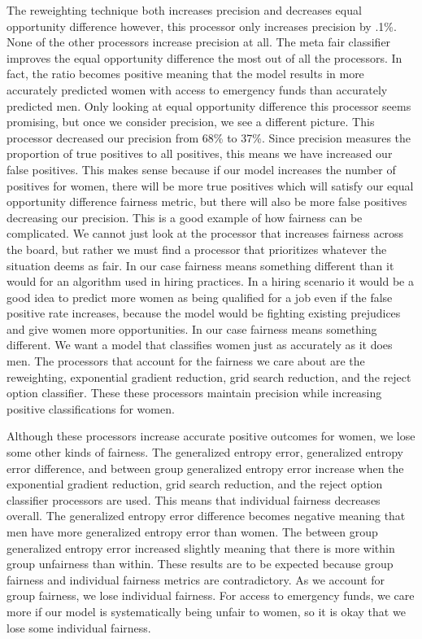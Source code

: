 \documentclass[water,article,submit,moreauthors,pdftex]{mdpi}
\begin{document}
The reweighting technique both increases precision and decreases equal
opportunity difference however, this processor only increases precision
by .1\%. None of the other processors increase precision at all. The
meta fair classifier improves the equal opportunity difference the most
out of all the processors. In fact, the ratio becomes positive meaning
that the model results in more accurately predicted women with access to
emergency funds than accurately predicted men. Only looking at equal
opportunity difference this processor seems promising, but once we
consider precision, we see a different picture. This processor decreased
our precision from 68\% to 37\%. Since precision measures the proportion
of true positives to all positives, this means we have increased our
false positives. This makes sense because if our model increases the
number of positives for women, there will be more true positives which
will satisfy our equal opportunity difference fairness metric, but there
will also be more false positives decreasing our precision. This is a
good example of how fairness can be complicated. We cannot just look at
the processor that increases fairness across the board, but rather we
must find a processor that prioritizes whatever the situation deems as
fair. In our case fairness means something different than it would for
an algorithm used in hiring practices. In a hiring scenario it would be
a good idea to predict more women as being qualified for a job even if
the false positive rate increases, because the model would be fighting
existing prejudices and give women more opportunities. In our case
fairness means something different. We want a model that classifies
women just as accurately as it does men. The processors that account for
the fairness we care about are the reweighting, exponential gradient
reduction, grid search reduction, and the reject option classifier.
These these processors maintain precision while increasing positive
classifications for women.

Although these processors increase accurate positive outcomes for women,
we lose some other kinds of fairness. The generalized entropy error,
generalized entropy error difference, and between group generalized
entropy error increase when the exponential gradient reduction, grid
search reduction, and the reject option classifier processors are used.
This means that individual fairness decreases overall. The generalized
entropy error difference becomes negative meaning that men have more
generalized entropy error than women. The between group generalized
entropy error increased slightly meaning that there is more within group
unfairness than within. These results are to be expected because group
fairness and individual fairness metrics are contradictory. As we
account for group fairness, we lose individual fairness. For access to
emergency funds, we care more if our model is systematically being
unfair to women, so it is okay that we lose some individual fairness.
\end{document}
